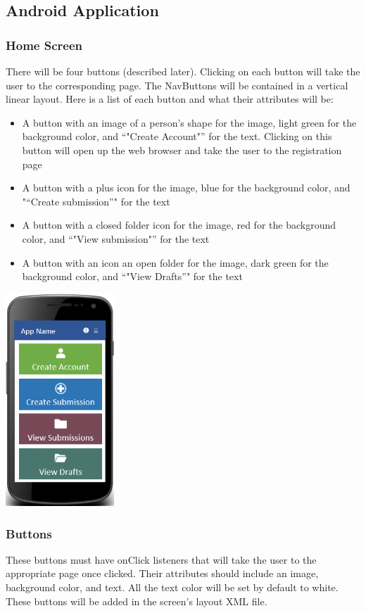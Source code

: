 \documentclass[onecolumn, draftclsnofoot,10pt, compsoc]{IEEEtran}
\begin{document}
\subsection{Android Application}
\subsubsection{Home Screen}
There will be four buttons (described later). Clicking on each button will take the user to the corresponding page. The NavButtons will be contained in a vertical linear layout. Here is a list of each button and what their attributes will be:
\begin{itemize}
\item A button with an image of a person’s shape for the image, light green for the background color, and “"Create Account"” for the text. Clicking on this button will open up the web browser and take the user to the registration page
\item A button with a plus icon for the image, blue for the background color, and "“Create submission”" for the text
\item A button with a closed folder icon for the image, red for the background color, and “"View submission"” for the text
\item A button with an icon an open folder for the image, dark green for the background color, and “"View Drafts”" for the text
\end{itemize}

\begin{center}
\includegraphics[height=8cm]{homescreen.png}
\end{center}


\subsubsection{Buttons}
These buttons must have onClick listeners that will take the user to the appropriate page once clicked. Their attributes should include an image, background color, and text. All the text color will be set by default to white. These buttons will be added in the screen's layout XML file.
\end{document}
